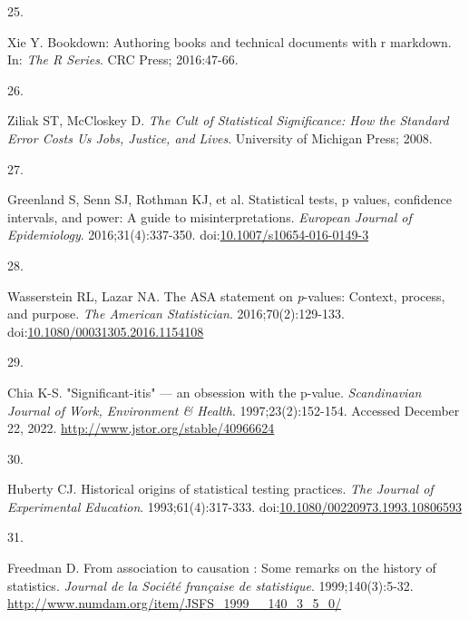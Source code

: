 \documentclass[smallextended]{svjour3}       %
\newlength{\cslhangindent}
\newlength{\csllabelwidth}
\newlength{\cslentryspacingunit} %
\newenvironment{CSLReferences}[2] %
 {%
  \setlength{\parindent}{0pt}
  \ifodd #1
  \let\oldpar\par
  \def\par{\hangindent=\cslhangindent\oldpar}
  \fi
  \setlength{\parskip}{#2\cslentryspacingunit}
 }%
 {}
\newcommand{\CSLLeftMargin}[1]{\parbox[t]{\csllabelwidth}{#1}}
\newcommand{\CSLRightInline}[1]{\parbox[t]{\linewidth - \csllabelwidth}{#1}\break}
\begin{document}
\begin{CSLReferences}{0}{0}
\leavevmode{}%
\CSLLeftMargin{25. }%
\CSLRightInline{Xie Y. Bookdown: Authoring books and technical documents
with r markdown. In: \emph{The {R} Series}. CRC Press; 2016:47-66.}

\leavevmode{}%
\CSLLeftMargin{26. }%
\CSLRightInline{Ziliak ST, McCloskey D. \emph{The Cult of Statistical
Significance: How the Standard Error Costs Us Jobs, Justice, and Lives}.
University of Michigan Press; 2008.}

\leavevmode{}%
\CSLLeftMargin{27. }%
\CSLRightInline{Greenland S, Senn SJ, Rothman KJ, et al. Statistical
tests, p values, confidence intervals, and power: A guide to
misinterpretations. \emph{European Journal of Epidemiology}.
2016;31(4):337-350.
doi:\href{https://doi.org/10.1007/s10654-016-0149-3}{10.1007/s10654-016-0149-3}}

\leavevmode{}%
\CSLLeftMargin{28. }%
\CSLRightInline{Wasserstein RL, Lazar NA. The {ASA} statement on
\emph{p}-values: Context, process, and purpose. \emph{The American
Statistician}. 2016;70(2):129-133.
doi:\href{https://doi.org/10.1080/00031305.2016.1154108}{10.1080/00031305.2016.1154108}}

\leavevmode{}%
\CSLLeftMargin{29. }%
\CSLRightInline{Chia K-S. "Significant-itis" --- an obsession with the
p-value. \emph{Scandinavian Journal of Work, Environment \& Health}.
1997;23(2):152-154. Accessed December 22, 2022.
\url{http://www.jstor.org/stable/40966624}}

\leavevmode{}%
\CSLLeftMargin{30. }%
\CSLRightInline{Huberty CJ. Historical origins of statistical testing
practices. \emph{The Journal of Experimental Education}.
1993;61(4):317-333.
doi:\href{https://doi.org/10.1080/00220973.1993.10806593}{10.1080/00220973.1993.10806593}}

\leavevmode{}%
\CSLLeftMargin{31. }%
\CSLRightInline{Freedman D. From association to causation : Some remarks
on the history of statistics. \emph{Journal de la Société française de
statistique}. 1999;140(3):5-32.
\url{http://www.numdam.org/item/JSFS_1999__140_3_5_0/}}

\end{CSLReferences}




\end{document}
